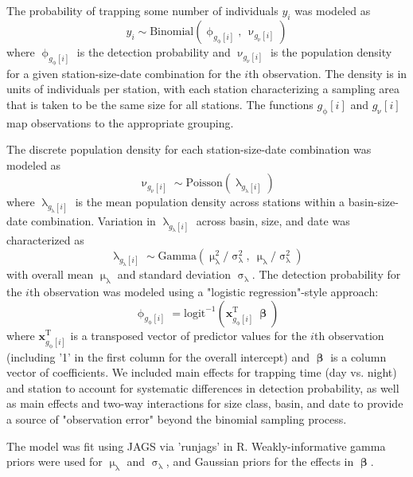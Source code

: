 The probability of trapping some number of individuals $y_i$ 
was modeled as
%
\begin{equation}
  y_i \sim \text{Binomial}\left(\upphi_{g_{\upphi}[i]}, ~\upnu_{g_{\upnu}[i]}\right)
\end{equation}
%
where $\upphi_{g_{\upphi}[i]}$ is the detection probability 
and $\upnu_{g_{\upnu}[i]}$ is the population density for a given 
station-size-date combination for the $i$th observation.
The density is in units of individuals per station, 
with each station characterizing a sampling area that is 
taken to be the same size for all stations.
The functions ${g_{\upphi}[i]}$ and ${g_{\upnu}[i]}$ map observations to the 
appropriate grouping. 

The discrete population density for each station-size-date combination was modeled as
%
\begin{equation}
  \upnu_{g_{\upnu}[i]} \sim \text{Poisson}\left(\uplambda_{g_{\uplambda}[i]}\right)
\end{equation}
where $\uplambda_{g_{\uplambda}[i]}$ is the mean population density across stations 
within a basin-size-date combination. 
Variation in $\uplambda_{g_{\uplambda}[i]}$ across basin, size, and date was characterized as 
%
\begin{equation}
  \uplambda_{g_{\uplambda}[i]} \sim 
    \text{Gamma}\left(\upmu_{\uplambda}^2/\upsigma_{\uplambda}^2,
      ~\upmu_{\uplambda}/\upsigma_{\uplambda}^2\right)
\end{equation}
%
with overall mean $\upmu_{\uplambda}$ and standard deviation $\upsigma_{\uplambda}$. 
The detection probability for the $i$th observation was modeled using a 
"logistic regression"-style approach:
%
\begin{equation}
  \upphi_{g_{\upphi}[i]} = 
    \text{logit}^{-1}\left(\mathbf{x}_{g_{\upphi}[i]}^\text{T}~{\boldsymbol\upbeta}\right)
\end{equation}
%
\noindent where $\mathbf{x}_{g_{\upphi}[i]}^\text{T}$ is a transposed vector 
of predictor values for the $i$th observation
(including '1' in the first column for the overall intercept)
and $\boldsymbol\upbeta$ is a column vector of coefficients. 
We included main effects for trapping time (day vs. night) and station 
to account for  systematic differences in detection probability, 
as well as main effects and two-way interactions for size class, basin, and date 
to provide a source of "observation error" beyond the binomial sampling process. 

The model was fit using JAGS via 'runjags' in R. 
Weakly-informative gamma priors were used for
$\upmu_{\uplambda}$ and $\upsigma_{\uplambda}$, and Gaussian priors 
for the effects in ${\boldsymbol\upbeta}$. 

